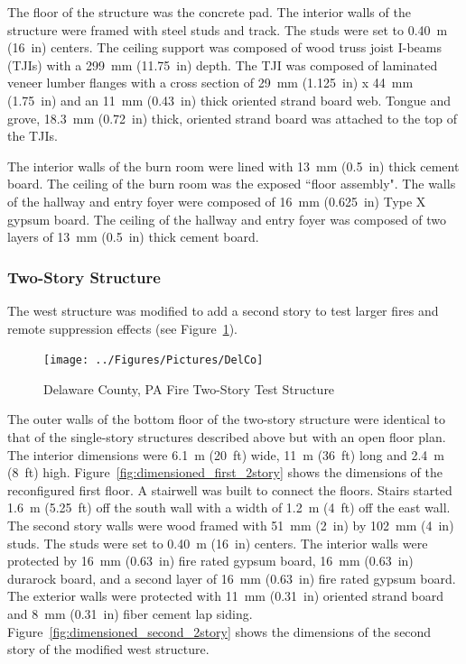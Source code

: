 \documentclass[12pt,oneside]{book}
\begin{document}
The floor of the structure was the concrete pad. The interior walls of the structure were framed with steel studs and track. The studs were set to 0.40~m (16~in) centers. The ceiling support was composed of wood truss joist I-beams (TJIs) with a 299~mm (11.75~in) depth. The TJI was composed of laminated veneer lumber flanges with a cross section of 29~mm (1.125~in) x 44~mm (1.75~in) and an 11~mm (0.43~in) thick oriented strand board web. Tongue and grove, 18.3~mm (0.72~in) thick, oriented strand board was attached to the top of the TJIs.

The interior walls of the burn room were lined with 13~mm (0.5~in) thick cement board. The ceiling of the burn room was the exposed ``floor assembly". The walls of the hallway and entry foyer were composed of 16~mm (0.625~in) Type X gypsum board. The ceiling of the hallway and entry foyer was composed of two layers of 13~mm (0.5~in) thick cement board.

\subsubsection*{Two-Story Structure}

The west structure was modified to add a second story to test larger fires and remote suppression effects (see Figure~\ref{fig:delco_2story}).

\begin{figure}[!ht]
	\texttt{[image: ../Figures/Pictures/DelCo]}
	\caption{Delaware County, PA Fire Two-Story Test Structure}
	\label{fig:delco_2story}
\end{figure}

The outer walls of the bottom floor of the two-story structure were identical to that of the single-story structures described above but with an open floor plan. The interior dimensions were 6.1~m (20~ft) wide, 11~m (36~ft) long and 2.4~m (8~ft) high. Figure~\ref{fig:dimensioned_first_2story} shows the dimensions of the reconfigured first floor. A stairwell was built to connect the floors. Stairs started 1.6~m (5.25~ft) off the south wall with a width of 1.2~m (4~ft) off the east wall. The second story walls were wood framed with 51~mm (2~in) by 102~mm (4~in) studs. The studs were set to 0.40~m (16~in) centers. The interior  walls were protected by 16~mm (0.63~in) fire rated gypsum board, 16~mm (0.63~in) durarock board, and a second layer of 16~mm (0.63~in) fire rated gypsum board. The exterior walls were protected with 11~mm (0.31~in) oriented strand board and 8~mm (0.31~in) fiber cement lap siding. Figure~\ref{fig:dimensioned_second_2story} shows the dimensions of the second story of the modified west structure.
\end{document}
